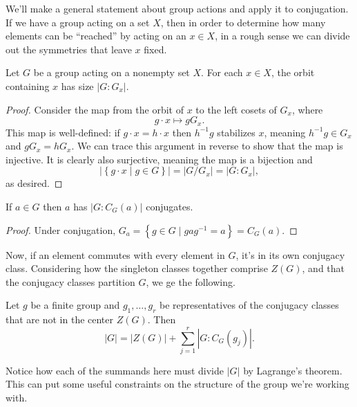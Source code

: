 \documentclass[../m171main.tex]{subfiles}
\begin{document}

We'll make a general statement about group actions and apply it to conjugation.
If we have a group acting on a set $X$, then in order to determine how many elements can be ``reached'' by acting on an $x \in X$, in a rough sense we can divide out the symmetries that leave $x$ fixed.

\begin{theorem}
    Let $G$ be a group acting on a nonempty set $X$.
    For each $x \in X$, the orbit containing $x$ has size $|G : G_x|$.
\end{theorem}

\begin{proof}
    Consider the map from the orbit of $x$ to the left cosets of $G_x$, where
    \[ g \cdot x \mapsto g G_x. \]
    This map is well-defined: if $g \cdot x = h \cdot x$ then $h^{-1}g$ stabilizes $x$, meaning $h^{-1} g \in G_x$ and $gG_x = hG_x$.
    We can trace this argument in reverse to show that the map is injective.
    It is clearly also surjective, meaning the map is a bijection and
    \[ \big| \left\{ g \cdot x \mid g \in G \right\} \big| = |G / G_x| = |G : G_x|, \]
    as desired.
\end{proof}

\begin{corollary}[]
    If $a \in G$ then $a$ has $|G : C_G(a)|$ conjugates.
\end{corollary}

\begin{proof}
    Under conjugation, $G_a = \left\{ g \in G \mid gag^{-1} = a \right\} = C_G(a)$.
\end{proof}

Now, if an element commutes with every element in $G$, it's in its own conjugacy class.
Considering how the singleton classes together comprise $Z(G)$, and that the conjugacy classes partition $G$, we ge the following.

\pagebreak

\begin{theorem}
    Let $g$ be a finite group and $g_1, \ldots, g_r$ be representatives of the conjugacy classes that are not in the center $Z(G)$.
    Then
    \[ |G| = |Z(G)| + \sum_{j=1}^{r} | G : C_G(g_j) |. \]
\end{theorem}

Notice how each of the summands here must divide $|G|$ by Lagrange's theorem.
This can put some useful constraints on the structure of the group we're working with.
\end{document}
